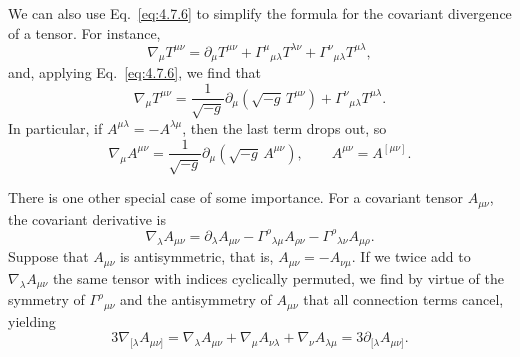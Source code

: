 We can also use Eq.~\eqref{eq:4.7.6} to simplify the formula for the
covariant divergence of a tensor. For instance,
\[
  \nabla_\mu T^{\mu\nu}
  =
  \partial_\mu T^{\mu\nu}
  +\Gamma^\mu{}_{\mu\lambda}T^{\lambda\nu}
  +\Gamma^\nu{}_{\mu\lambda}T^{\mu\lambda},
\]
and, applying Eq.~\eqref{eq:4.7.6}, we find that
\begin{equation}
  \nabla_\mu T^{\mu\nu}
  =
  \frac{1}{\sqrt{-g}}
  \partial_\mu\!\left(\sqrt{-g}\,T^{\mu\nu}\right)
  +\Gamma^\nu{}_{\mu\lambda}T^{\mu\lambda}.
  \tag{4.7.9}\label{eq:4.7.9}
\end{equation}
In particular, if \(A^{\mu\lambda}=-A^{\lambda\mu}\), then the last term
drops out, so
\begin{equation}
  \nabla_\mu A^{\mu\nu}
  =
  \frac{1}{\sqrt{-g}}
  \partial_\mu\!\left(\sqrt{-g}\,A^{\mu\nu}\right),
  \qquad A^{\mu\nu}=A^{[\mu\nu]}.
  \tag{4.7.10}\label{eq:4.7.10}
\end{equation}

There is one other special case of some importance. For a covariant tensor
\(A_{\mu\nu}\), the covariant derivative is
\[
  \nabla_\lambda A_{\mu\nu}
  =
  \partial_\lambda A_{\mu\nu}
  -\Gamma^\rho{}_{\lambda\mu}A_{\rho\nu}
  -\Gamma^\rho{}_{\lambda\nu}A_{\mu\rho}.
\]
Suppose that \(A_{\mu\nu}\) is antisymmetric, that is,
\(A_{\mu\nu}=-A_{\nu\mu}\). If we twice add to
\(\nabla_\lambda A_{\mu\nu}\) the same tensor with indices cyclically
permuted, we find by virtue of the symmetry of
\(\Gamma^\rho{}_{\mu\nu}\) and the antisymmetry of \(A_{\mu\nu}\) that all
connection terms cancel, yielding
\begin{equation}
  3\nabla_{[\lambda}A_{\mu\nu]}
  =
  \nabla_\lambda A_{\mu\nu}
  +\nabla_\mu A_{\nu\lambda}
  +\nabla_\nu A_{\lambda\mu}
  =
  3\partial_{[\lambda}A_{\mu\nu]}.
  \tag{4.7.11}\label{eq:4.7.11}
\end{equation}
